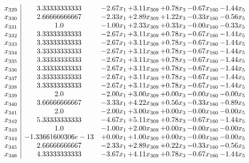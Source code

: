 \documentclass[8pt]{article}
\begin{document}
\[\begin{array}{c| c c@{\hskip 2pt} c@{\hskip 2pt} c@{\hskip 2pt} c@{\hskip 2pt} c@{\hskip 2pt} }
 x_{329}   &  3.33333333333 & -2.67 x_{1} & +  3.11 x_{309} & +  0.78 x_{3} & -0.67 x_{160} & -1.44 x_{5}\\
 x_{330}   &  2.66666666667 & -2.33 x_{1} & +  2.89 x_{309} & +  1.22 x_{3} & -0.33 x_{160} & -0.56 x_{5}\\
 x_{331}   &  1.0 & -1.00 x_{1} & +  2.33 x_{309} & +  0.33 x_{3} & -0.00 x_{160} & -0.33 x_{5}\\
 x_{332}   &  3.33333333333 & -2.67 x_{1} & +  3.11 x_{309} & +  0.78 x_{3} & -0.67 x_{160} & -1.44 x_{5}\\
 x_{333}   &  3.33333333333 & -2.67 x_{1} & +  3.11 x_{309} & +  0.78 x_{3} & -0.67 x_{160} & -1.44 x_{5}\\
 x_{334}   &  3.33333333333 & -2.67 x_{1} & +  3.11 x_{309} & +  0.78 x_{3} & -0.67 x_{160} & -1.44 x_{5}\\
 x_{335}   &  3.33333333333 & -2.67 x_{1} & +  3.11 x_{309} & +  0.78 x_{3} & -0.67 x_{160} & -1.44 x_{5}\\
 x_{336}   &  3.33333333333 & -2.67 x_{1} & +  3.11 x_{309} & +  0.78 x_{3} & -0.67 x_{160} & -1.44 x_{5}\\
 x_{337}   &  3.33333333333 & -2.67 x_{1} & +  3.11 x_{309} & +  0.78 x_{3} & -0.67 x_{160} & -1.44 x_{5}\\
 x_{338}   &  3.33333333333 & -2.67 x_{1} & +  3.11 x_{309} & +  0.78 x_{3} & -0.67 x_{160} & -1.44 x_{5}\\
 x_{339}   &  2.0 & -2.00 x_{1} & +  3.00 x_{309} & +  0.00 x_{3} & -0.00 x_{160} & -0.00 x_{5}\\
 x_{340}   &  3.66666666667 & -3.33 x_{1} & +  4.22 x_{309} & +  0.56 x_{3} & -0.33 x_{160} & -0.89 x_{5}\\
 x_{341}   &  2.0 & -2.00 x_{1} & +  3.00 x_{309} & +  0.00 x_{3} & -0.00 x_{160} & -0.00 x_{5}\\
 x_{342}   &  5.33333333333 & -4.67 x_{1} & +  5.11 x_{309} & +  0.78 x_{3} & -0.67 x_{160} & -1.44 x_{5}\\
 x_{343}   &  1.0 & -1.00 x_{1} & +  2.00 x_{309} & +  0.00 x_{3} & -0.00 x_{160} & -0.00 x_{5}\\
 x_{344}   &  -1.33661600306e-13 & +  0.00 x_{1} & +  1.00 x_{309} & +  0.00 x_{3} & -0.00 x_{160} & -0.00 x_{5}\\
 x_{345}   &  2.66666666667 & -2.33 x_{1} & +  2.89 x_{309} & +  0.22 x_{3} & -0.33 x_{160} & -0.56 x_{5}\\
 x_{346}   &  4.33333333333 & -3.67 x_{1} & +  4.11 x_{309} & +  0.78 x_{3} & -0.67 x_{160} & -1.44 x_{5}\\

\end{array}\]
\end{document}
